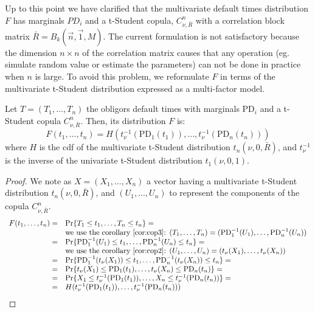 \documentclass[11pt,fleqn]{book} %
\begin{document}
Up to this point we have clarified that the multivariate default times 
distribution $F$ has marginals $PD_i$ and a t-Student copula, 
$C_{\nu,\bar{R}}^n$ with a correlation block matrix
$\bar{R} = B_k(\vec{n},\vec{1},M)$.
The current formulation is not satisfactory because the dimension 
$n {\times} n$ of the correlation matrix causes that any operation 
(eg. simulate random value or estimate the parameters) can not be
done in practice when $n$ is large. To avoid this problem, we reformulate
$F$ in terms of the multivariate t-Student distribution expressed as a 
multi-factor model.

\begin{proposition}
	\label{prop:dtd}
	Let $T=(T_1,\dots,T_n)$ the obligors default times with marginals 
	$\text{PD}_i$ and a t-Student copula $C_{\nu,\bar{R}}^n$. Then, its 
	distribution $F$ is:
	\begin{displaymath}
		F(t_1,\dots,t_n) = H\left(t_\nu^{-1}(\text{PD}_1(t_1)), \dots, t_\nu^{-1}(\text{PD}_n(t_n))\right)
	\end{displaymath}
	where $H$ is the cdf of the multivariate t-Student distribution 
	$t_n(\nu,0,\bar{R})$, and $t_\nu^{-1}$ is the inverse of the univariate 
	t-Student distribution $t_1(\nu,0,1)$.
\end{proposition}
\begin{proof}
	We note as $X=(X_1,\dots,X_n)$ a vector having a multivariate t-Student
	distribution $t_n(\nu,0,\bar{R})$, and $(U_1,\dots,U_n)$ to represent
	the components of the copula $C_{\nu,\bar{R}}^n$.
	\begin{displaymath}
		\begin{array}{rl}
			F(t_1,\dots,t_n) = & \Pr\{ T_1 \le t_1 , \dots, T_n \le t_n \} =                                    \\
			                   & \text{we use the corollary \ref{cor:cop3}: }                                   
			(T_1,\dots,T_n) = (\text{PD}_1^{-1}(U_1),\dots,\text{PD}_n^{-1}(U_n)) \\
			=                  & \Pr\{ \text{PD}_1^{-1}(U_1) \le t_1 , \dots , \text{PD}_n^{-1}(U_n) \le t_n \} =               \\
			                   & \text{we use the corollary \ref{cor:cop2}: }                                   
			(U_1,\dots,U_n) = (t_\nu(X_1),\dots,t_\nu(X_n)) \\
			=                  & \Pr\{ \text{PD}_1^{-1}(t_\nu(X_1)) \le t_1 , \dots , \text{PD}_n^{-1}(t_\nu(X_n)) \le t_n \} = \\
			=                  & \Pr\{ t_\nu(X_1) \le \text{PD}_1(t_1) , \dots , t_\nu(X_n) \le \text{PD}_n(t_n) \} =           \\
			=                  & \Pr\{ X_1 \le t_\nu^{-1}(\text{PD}_1(t_1)) , \dots , X_n \le t_\nu^{-1}(\text{PD}_n(t_n)) \} = \\
			=                  & H(t_\nu^{-1}(\text{PD}_1(t_1)), \dots, t_\nu^{-1}(\text{PD}_n(t_n)))                           \\
		\end{array}
	\end{displaymath}
\end{proof}
\end{document}
